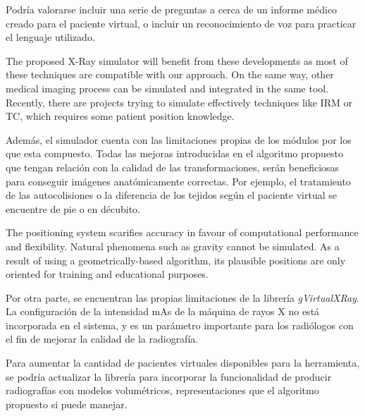 Podría valorarse incluir una serie de preguntas a cerca de un informe médico creado para el paciente virtual, o incluir un reconocimiento de voz para practicar el lenguaje utilizado. 

The proposed X-Ray simulator will benefit from these developments as most of these techniques are compatible with our approach. On the same way, other medical imaging process can be simulated and integrated in the same tool. Recently, there are projects trying to simulate effectively techniques like \acs{IRM} or \acs{TC}, which requires some patient position knowledge. 

Además, el simulador cuenta con las limitaciones propias de los módulos por los que esta compuesto. Todas las mejoras introducidas en el algoritmo propuesto que tengan relación con la calidad de las transformaciones, serán beneficiosas para conseguir imágenes anatómicamente correctas. Por ejemplo, el tratamiento de las autocolisiones o la diferencia de los tejidos según el paciente virtual se encuentre de pie o en décubito.

The positioning system  scarifies accuracy in favour of computational performance and flexibility. Natural phenomena such as gravity cannot be simulated. As a result of using a geometrically-based algorithm, its plausible positions are only oriented for training and educational purposes.


Por otra parte, se encuentran las propias limitaciones de la librería \emph{gVirtualXRay}. La configuración de la intensidad \acs{mAs} de la máquina de rayos X no está incorporada en el sistema, y es un parámetro importante para los radiólogos con el fin de mejorar la calidad de la radiografía.

Para aumentar la cantidad de pacientes virtuales disponibles para la herramienta, se podría actualizar la librería para incorporar la funcionalidad de producir radiografías con modelos volumétricos, representaciones que el algoritmo propuesto si puede manejar.

